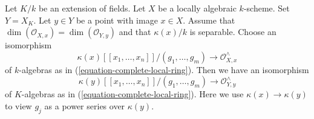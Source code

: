 \begin{lemma}
\label{lemma-base-change-complete-local-ring}
Let $K/k$ be an extension of fields. Let $X$ be a locally algebraic
$k$-scheme. Set $Y = X_K$. Let $y \in Y$ be a point with image $x \in X$.
Assume that $\dim(\mathcal{O}_{X, x}) = \dim(\mathcal{O}_{Y, y})$
and that $\kappa(x)/k$ is separable.
Choose an isomorphism
$$
\kappa(x)[[x_1, \ldots, x_n]]/(g_1, \ldots, g_m) \longrightarrow
\mathcal{O}_{X, x}^\wedge
$$
of $k$-algebras as in (\ref{equation-complete-local-ring}).
Then we have an isomorphism
$$
\kappa(y)[[x_1, \ldots, x_n]]/(g_1, \ldots, g_m) \longrightarrow
\mathcal{O}_{Y, y}^\wedge
$$
of $K$-algebras as in (\ref{equation-complete-local-ring}). Here we use
$\kappa(x) \to \kappa(y)$ to view $g_j$ as a power series
over $\kappa(y)$.
\end{lemma}

